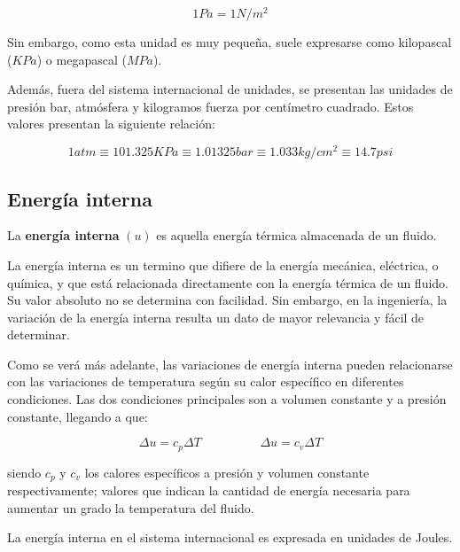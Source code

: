 \begin{equation}\label{EA1-Presión unidades}
    1 Pa = 1N/m^2
\end{equation}

Sin embargo, como esta unidad es muy pequeña, suele expresarse como kilopascal ($KPa$) o megapascal ($MPa$).

Además, fuera del sistema internacional de unidades, se presentan las unidades de presión bar, atmósfera y kilogramos fuerza por centímetro cuadrado. Estos valores presentan la siguiente relación:

\begin{equation}\label{EA1-Relación entre unidades}
    1atm \equiv 101.325KPa \equiv 1.01325bar \equiv 1.033kg/cm^2 \equiv 14.7psi
\end{equation}


\subsection{Energía interna}

\begin{defs}
    La \textbf{energía interna} $(u)$ es aquella energía térmica almacenada de un fluido.
\end{defs}

La energía interna es un termino que difiere de la energía mecánica, eléctrica, o química, y que está relacionada directamente con la energía térmica de un fluido. Su valor absoluto no se determina con facilidad. Sin embargo, en la ingeniería, la variación de la energía interna resulta un dato de mayor relevancia y fácil de determinar.

Como se verá más adelante, las variaciones de energía interna pueden relacionarse con las variaciones de temperatura según su calor específico en diferentes condiciones. Las dos condiciones principales son a volumen constante y a presión constante, llegando a que:

\begin{equation}
    \Delta u = c_p \Delta T \hspace{2cm} \Delta u = c_v \Delta T 
\end{equation}

siendo $c_p$ y $c_v$ los calores específicos a presión y volumen constante respectivamente; valores que indican la cantidad de energía necesaria para aumentar un grado la temperatura del fluido.

La energía interna en el sistema internacional es expresada en unidades de Joules.


